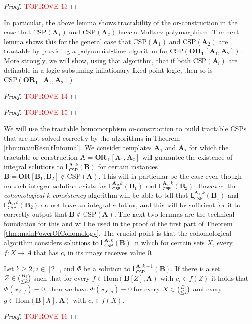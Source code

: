 \documentclass[a4paper,english, thm-restate]{lipics-v2021}
\newcommand{\StructA}{\mathbf{A}}
\newcommand{\StructB}{\mathbf{B}}
\newcommand{\CSP}[1]{\mathrm{CSP}(#1)}
\newcommand{\Hom}[2]{\mathrm{Hom}(#1,#2)}
\newcommand{\leqs}{\mathsf{L}}
\newcommand{\cspiso}[3]{\leqs^{#1,#2}_{\mathsf{CSP}}(#3)}
\newcommand{\ORT}[1]{\mathbf{OR}_\text{T}[#1]}
\newcommand{\OR}[1]{\mathbf{OR}[#1]}
\begin{document}
	\maltsevForOrConstruction*
	\begin{proof}\textcolor{red}{TOPROVE 13}\end{proof}	
	
	\noindent In particular, the above lemma shows tractability of the or-construction in the case that $\CSP{\StructA_1}$ and $\CSP{\StructA_2}$ have a Maltsev polymorphism.
	The next lemma shows this for the general case that $\CSP{\StructA_1}$ and $\CSP{\StructA_2}$ are tractable by providing a polynomial-time algorithm
	for $\CSP{\ORT{\StructA_1,\StructA_2}}$.
	More strongly, we will show, using that algorithm, that if both $\CSP{\StructA_i}$
	are definable in a logic subsuming inflationary fixed-point logic,
	then so is $\CSP{\ORT{\StructA_1,\StructA_2}}$.
	
	\homOrTractable*
	\begin{proof}\textcolor{red}{TOPROVE 14}\end{proof}
	
	\homOrDefinable*
	\begin{proof}\textcolor{red}{TOPROVE 15}\end{proof}
	
	\noindent We will use the tractable homomorphism or-construction to build
	tractable CSPs that are not solved correctly by the algorithms in Theorem \ref{thm:mainResultInformal}.
	We consider templates $\StructA_1$ and $\StructA_2$ for which the tractable or-construction $\StructA = \ORT{\StructA_1,\StructA_2}$ will guarantee the existence of integral solutions to $\cspiso{\StructA}{k}{\StructB}$ for certain instances $\StructB = \OR{\StructB_1,\StructB_2} \notin \CSP{\StructA}$. This will in particular be the case even though no such integral solution exists for $\cspiso{\StructA_1}{k}{\StructB_1}$ and $\cspiso{\StructA_2}{k}{\StructB_2}$.
	However, the \emph{cohomological $k$-consistency} algorithm will be able to tell that $\cspiso{\StructA_1}{k}{\StructB_1}$ and $\cspiso{\StructA_2}{k}{\StructB_2}$ do not have an integral solution, and this will be sufficient for it to correctly output that $\StructB \notin \CSP{\StructA}$. The next two lemmas are the technical foundation for this and will be used in the proof of the first part of Theorem \ref{thm:mainPowerOfCohomology}.
	The crucial point is that the cohomological algorithm considers solutions to $\cspiso{\StructA}{k}{\StructB}$ in which for certain sets $X$, every $f: X \to A$ that has $c_i$ in its image receives value $0$.
	
	\begin{lemma}
		\label{lem:fixingIntegerSolutionInOr}
		Let $k \geq 2$, $i \in [2]$, 
		and $\Phi$ be a solution to $\cspiso{\StructA}{k+1}{\StructB}$.
		If there is a set $Z \in \tbinom{B_i}{\leq k}$ such that
		for every $f\in \Hom{\StructB[Z]}{\StructA}$ with $c_i \in f(Z)$
		it holds that
		$\Phi(x_{Z,f}) = 0$, then we have $\Phi(x_{X,g}) = 0$
		for every $X \in \tbinom{B_i}{\leq k}$ and every
		$g\in \Hom{\StructB[X]}{\StructA}$ with $c_i \in f(X)$.
	\end{lemma}
	\begin{proof}\textcolor{red}{TOPROVE 16}\end{proof}
	
\end{document}
